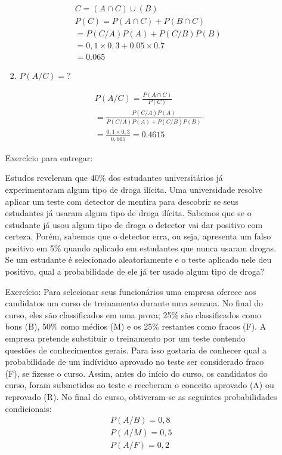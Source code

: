 \documentclass[11pt,a4paper]{book}
\begin{document}
\begin{enumerate}[label=(\alph*)]
\begin{enumerate}
\begin{enumerate}[label=(\alph*)]
    \begin{align*}
      C = (A \cap C ) \cup (B)\\
      P(C) = P(A \cap C) + P( B \cap C  )\\
      =P(C/A)P(A)+P(C/B)P(B)\\
      =0,1 \times 0,3 + 0.05 \times 0.7\\
      =0.065
    \end{align*}
  \item $P(A/C)=$?

    \begin{align*}
      P(A/C)= \frac{P(A\cap C)}{P(C)}\\
      = \frac{P(C/A)P(A)}{P(C/A)P(A)+P(C/B)P(B)}\\
      =\frac{0,1 \times 0,3}{0,065}=0.4615
    \end{align*}
\end{enumerate}

Exercício para entregar:

Estudos reveleram que 40\% dos estudantes universitários
já experimentaram algum tipo de droga ilícita. Uma universidade resolve aplicar 
um teste com detector de mentira para descobrir se seus estudantes já usaram algum 
tipo de droga ilícita. Sabemos que se o estudante já usou algum tipo de droga 
o detector vai dar positivo com certeza. Porém, sabemos que o detector erra, ou 
seja, apresenta um falso positivo em 5\% quando aplicado em estudantes que nunca 
usaram drogas. Se um estudante é selecionado aleatoriamente e o teste aplicado 
nele deu positivo, qual a probabilidade de ele já ter usado algum tipo de droga?

Exercício: Para selecionar seus funcionários uma empresa oferece aos candidatos 
um curso de treinamento durante uma semana. No final do curso, eles são classificados
em uma prova; 25\% são classificados como bons (B), 50\% como médios (M) e os 
25\% restantes como fracos (F). A empresa pretende substituir o treinamento por um teste 
contendo questões de conhecimentos gerais. Para isso gostaria de conhecer qual a 
probabilidade de um indíviduo aprovado no teste ser considerado fraco (F), se 
fizesse o curso. Assim, antes do início do curso, os candidatos do curso, foram 
submetidos ao teste e receberam o conceito aprovado (A) ou reprovado (R). No final 
do curso, obtiveram-se as seguintes probabilidades condicionais: 
\begin{align*}
  P(A/B)= 0,8\\
  P(A/M) = 0,5\\
  P(A/F)=0,2
\end{align*}

\end{enumerate}
\end{enumerate}
\end{document}
